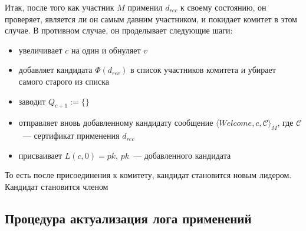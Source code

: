 Итак, после того как участник $M$ применил $d_{rec}$ к своему состоянию, он проверяет, является ли он самым давним участником, и покидает комитет в этом случае.
В противном случае, он проделывает следующие шаги:
\begin{itemize}
\item увеличивает $c$ на один и обнуляет $v$
\item добавляет кандидата $\Phi(d_{rec})$ в список участников комитета и убирает самого старого из списка
\item заводит $Q_{c+1} := \{\}$
\item отправляет вновь добавленному кандидату сообщение $\langle Welcome, c, \mathcal{C} \rangle_M$, где $\mathcal{C}$~--- сертификат применения $d_{rec}$
\item присваивает $L(c, 0)=pk$, $pk$~--- добавленного кандидата
\end{itemize}

То есть после присоединения к комитету, кандидат становится новым лидером. Кандидат становится членом

\subsection{Процедура актуализация лога применений} \label{act_log}
